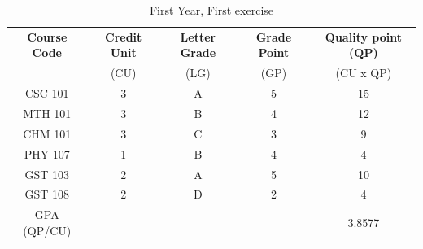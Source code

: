 \documentclass{article}
\begin{document}
 	 \begin{table}[h!]
 		\begin{center}
 			\caption{First Year, First exercise}
 			\label{tab: Class exercise}
 			\begin{tabular} {c|c|c|c|c}
 		\textbf{Course Code} & \textbf{Credit Unit} & \textbf{Letter Grade} & \textbf{Grade Point} & \textbf{Quality point (QP)}\\
 					& (CU)  & (LG) & (GP) & (CU x QP)\\
       \hline
 	 CSC 101 & 3 & A & 5 & 15\\
     MTH 101 & 3 & B & 4 & 12\\
     CHM 101 & 3 & C & 3 & 9 \\
 	 PHY 107 & 1 & B & 4 & 4\\				
 	GST 103 & 2 & A & 5 & 10\\
 	GST 108 & 2 & D & 2 & 4\\
 	GPA (QP/CU) & & & & 3.8577\\				
 		  \end{tabular}
 			\end{center}
 			
 \end{table}
 
\end{document}
